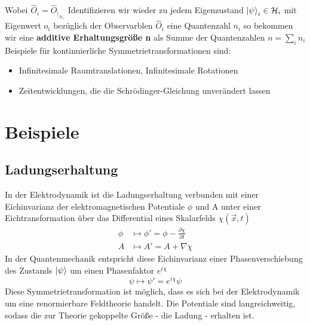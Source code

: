 \documentclass[Ex4_Zusammenfassung.tex]{subfiles}
\begin{document}
Wobei $\hat{O}_i = \hat{O}_{|_{\mathcal{H}_i}}$ \newline
Identifizieren wir wieder zu jedem Eigenzustand $\ket{\psi}_i \in \mathcal{H}_i$ mit Eigenwert $o_i$ bezüglich der Observarblen $\hat{O}_i$ eine Quantenzahl $n_i$ so bekommen wir eine \textbf{additive Erhaltungsgröße n} als Summe der Quantenzahlen $ n = \sum_i n_i$ \\ \newline
Beispiele für kontinuierliche Symmetrietransformationen sind:
\begin{itemize}
\item Infinitesimale Raumtranslationen, Infinitesimale Rotationen
\item Zeitentwicklungen, die die Schrödinger-Gleichung unverändert lassen
\end{itemize}

\section{Beispiele}
\subsection{Ladungserhaltung}
In der Elektrodynamik ist die Ladungserhaltung verbunden mit einer Eichinvarianz der elektromagnetischen Potentiale $\phi$ und A unter einer Eichtransformation über das Differential eines Skalarfelds $\chi(\vec x,t)$
\begin{align}
\phi & \mapsto \phi' = \phi - \frac{\partial \chi}{\partial t} \\
A & \mapsto A' = A + \nabla \chi 
\end{align}
In der Quantenmechanik entspricht diese Eichinvarianz einer Phasenverschiebung des Zustands $\ket{\psi}$ um einen Phasenfaktor $e^{i\chi}$
\begin{equation}
\psi \mapsto \psi' = e^{i\chi} \psi
\end{equation}
Diese Symmetrietransformation ist möglich, dass es sich bei der Elektrodynamik um eine renormierbare Feldtheorie handelt. Die Potentiale sind langreichweitig, sodass die zur Theorie gekoppelte Größe - die Ladung - erhalten ist.
\end{document}
